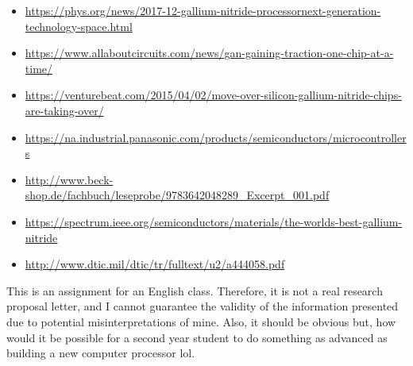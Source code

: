 \documentclass[letterpaper]{letter}
\begin{document}
\begin{itemize}
  \item \url{https://phys.org/news/2017-12-gallium-nitride-processornext-generation-technology-space.html}
  \item \url{https://www.allaboutcircuits.com/news/gan-gaining-traction-one-chip-at-a-time/}
  \item \url{https://venturebeat.com/2015/04/02/move-over-silicon-gallium-nitride-chips-are-taking-over/}
  \item \url{https://na.industrial.panasonic.com/products/semiconductors/microcontrollers}
  \item \url{http://www.beck-shop.de/fachbuch/leseprobe/9783642048289_Excerpt_001.pdf}
  \item \url{https://spectrum.ieee.org/semiconductors/materials/the-worlds-best-gallium-nitride}
  \item \url{http://www.dtic.mil/dtic/tr/fulltext/u2/a444058.pdf}
\end{itemize}
\vspace*{\fill}
This is an assignment for an English class. Therefore, it is not a real research
proposal letter, and I cannot guarantee the validity of the information
presented due to potential misinterpretations of mine. Also, it should be
obvious but, how would it be possible for a second year student to do something
as advanced as building a new computer processor lol.
\end{document}
